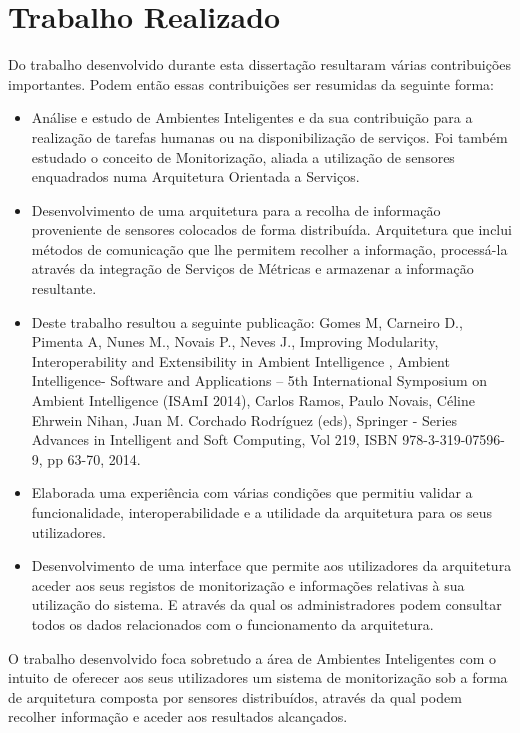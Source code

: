 \section{Trabalho Realizado}

Do trabalho desenvolvido durante esta dissertação resultaram várias contribuições importantes. Podem então essas contribuições ser resumidas da seguinte forma:

\begin{itemize}
	\item Análise e estudo de Ambientes Inteligentes e da sua contribuição para a realização de tarefas humanas ou na disponibilização de serviços. Foi também estudado o conceito de Monitorização, aliada a utilização de sensores enquadrados numa Arquitetura Orientada a Serviços.
	\item Desenvolvimento de uma arquitetura para a recolha de informação proveniente de sensores colocados de forma distribuída. Arquitetura que inclui métodos de comunicação que lhe permitem recolher a informação, processá-la através da integração de Serviços de Métricas e armazenar a informação resultante.
	\item Deste trabalho resultou a seguinte publicação: Gomes M, Carneiro D., Pimenta A, Nunes M., Novais P., Neves J., Improving Modularity, Interoperability and Extensibility in Ambient Intelligence , Ambient Intelligence- Software and Applications – 5th International Symposium on Ambient Intelligence (ISAmI 2014), Carlos Ramos, Paulo Novais, Céline Ehrwein Nihan, Juan M. Corchado Rodríguez (eds), Springer - Series Advances in Intelligent and Soft Computing, Vol 219, ISBN 978-3-319-07596-9, pp 63-70, 2014.
	\item Elaborada uma experiência com várias condições que permitiu validar a funcionalidade, interoperabilidade e a utilidade da arquitetura para os seus utilizadores.
	\item Desenvolvimento de uma interface que permite aos utilizadores da arquitetura aceder aos seus registos de monitorização e informações relativas à sua utilização do sistema. E através da qual os administradores podem consultar todos os dados relacionados com o funcionamento da arquitetura.

\end{itemize}

O trabalho desenvolvido foca sobretudo a área de Ambientes Inteligentes com o intuito de oferecer aos seus utilizadores um sistema de monitorização sob a forma de arquitetura composta por sensores distribuídos, através da qual podem recolher informação e aceder aos resultados alcançados.


